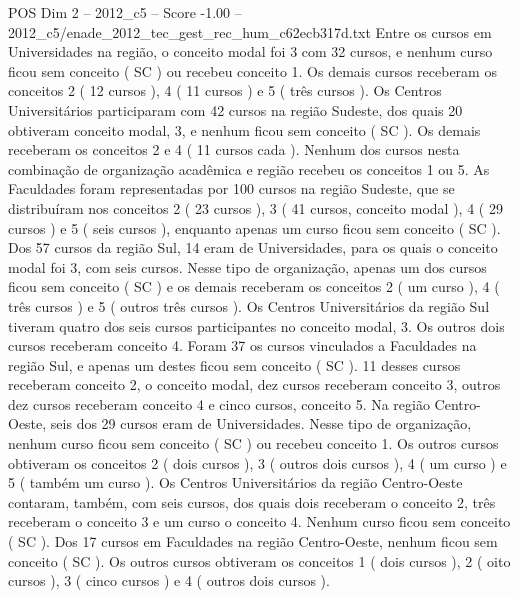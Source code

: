 \begin{textsample}{POS Dim 2 – 2012\_c5 – Score -1.00 – 2012\_c5/enade\_2012\_tec\_gest\_rec\_hum\_c62ecb317d.txt}
Entre os cursos em Universidades na região, o conceito modal foi 3 com 32 cursos, e nenhum curso ficou sem conceito ( SC ) ou recebeu conceito 1.
Os demais cursos receberam os conceitos 2 ( 12 cursos ), 4 ( 11 cursos ) e 5 ( três cursos ).
Os Centros Universitários participaram com 42 cursos na região Sudeste, dos quais 20 obtiveram conceito modal, 3, e nenhum ficou sem conceito ( SC ).
Os demais receberam os conceitos 2 e 4 ( 11 cursos cada ).
Nenhum dos cursos nesta combinação de organização acadêmica e região recebeu os conceitos 1 ou 5.
As Faculdades foram representadas por 100 cursos na região Sudeste, que se distribuíram nos conceitos 2 ( 23 cursos ), 3 ( 41 cursos, conceito modal ), 4 ( 29 cursos ) e 5 ( seis cursos ), enquanto apenas um curso ficou sem conceito ( SC ).
Dos 57 cursos da região Sul, 14 eram de Universidades, para os quais o conceito modal foi 3, com seis cursos.
Nesse tipo de organização, apenas um dos cursos ficou sem conceito ( SC ) e os demais receberam os conceitos 2 ( um curso ), 4 ( três cursos ) e 5 ( outros três cursos ).
Os Centros Universitários da região Sul tiveram quatro dos seis cursos participantes no conceito modal, 3.
Os outros dois cursos receberam conceito 4.
Foram 37 os cursos vinculados a Faculdades na região Sul, e apenas um destes ficou sem conceito ( SC ). 11 desses cursos receberam conceito 2, o conceito modal, dez cursos receberam conceito 3, outros dez cursos receberam conceito 4 e cinco cursos, conceito 5.
Na região Centro-Oeste, seis dos 29 cursos eram de Universidades.
Nesse tipo de organização, nenhum curso ficou sem conceito ( SC ) ou recebeu conceito 1.
Os outros cursos obtiveram os conceitos 2 ( dois cursos ), 3 ( outros dois cursos ), 4 ( um curso ) e 5 ( também um curso ).
Os Centros Universitários da região Centro-Oeste contaram, também, com seis cursos, dos quais dois receberam o conceito 2, três receberam o conceito 3 e um curso o conceito 4.
Nenhum curso ficou sem conceito ( SC ).
Dos 17 cursos em Faculdades na região Centro-Oeste, nenhum ficou sem conceito ( SC ).
Os outros cursos obtiveram os conceitos 1 ( dois cursos ), 2 ( oito cursos ), 3 ( cinco cursos ) e 4 ( outros dois cursos ).

\end{textsample}
